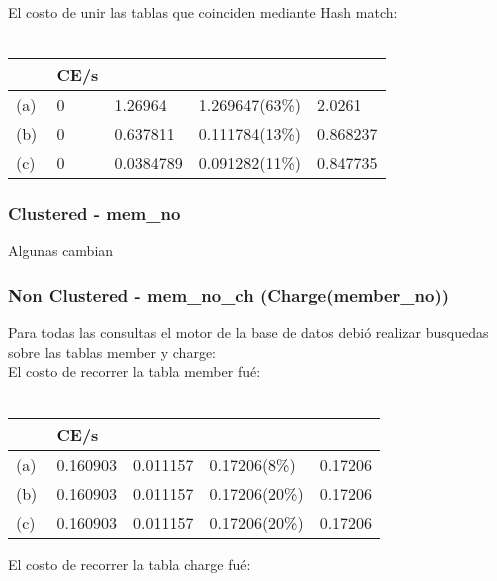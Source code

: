 El costo de unir las tablas que coinciden mediante Hash match: \\ \\

\begin{tabular}{| L | L | L | L | L |}
    \hline
     & CE/s &  &  &  \\ \hline
    (a) & 0 & 1.26964 & 1.269647(63\%) & 2.0261 \\ \hline
    (b) & 0 & 0.637811 & 0.111784(13\%) & 0.868237 \\ \hline
    (c) & 0 & 0.0384789 & 0.091282(11\%) & 0.847735 \\ \hline
\end{tabular}




\subsubsection{Clustered - mem\_no}

Algunas cambian


	
\subsubsection{Non Clustered - mem\_no\_ch (Charge(member\_no))}
Para todas las consultas el motor de la base de datos debió realizar busquedas sobre las tablas member y charge: \\  

El costo de recorrer la tabla member fué: \\ \\

\begin{tabular}{| L | L | L | L | L |}
    \hline
     & CE/s &  &  &  \\ \hline
    (a) & 0.160903 & 0.011157 & 0.17206(8\%) & 0.17206 \\ \hline
    (b) & 0.160903 & 0.011157 & 0.17206(20\%) & 0.17206 \\ \hline
    (c) & 0.160903 & 0.011157 & 0.17206(20\%) & 0.17206 \\ \hline
\end{tabular}

El costo de recorrer la tabla charge fué: \\ \\


